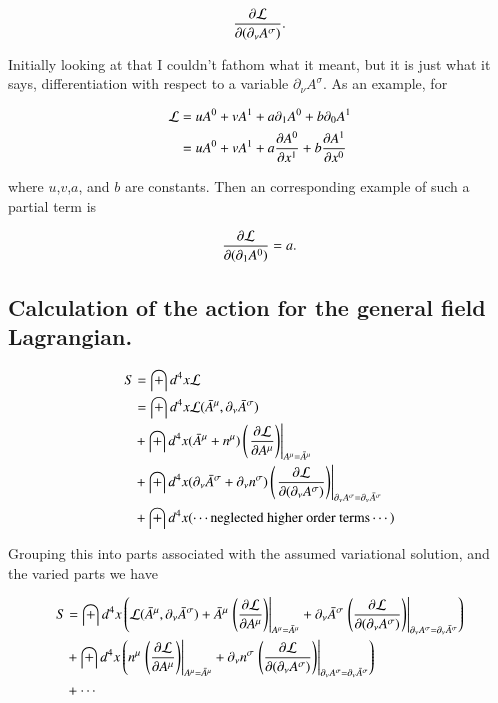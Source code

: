 \documentclass{article}
\newcommand{\barA}[0]{\bar{A}}
\begin{document}
\begin{align*}
\PD{(\partial_\nu A^\sigma)}{\LL}.
\end{align*}

Initially looking at that I couldn't fathom what it meant, but it is just what it says, 
differentiation with respect to a variable $\partial_\nu A^\sigma$.  As an example, for

\begin{align*}
\LL 
&= u A^0 + v A^1 + a \partial_1 A^0 + b \partial_0 A^1 \\
&= u A^0 + v A^1 + a \PD{x^1}{A^0} + b \PD{x^0}{A^1}
\end{align*}

where $u$,$v$,$a$, and $b$ are constants.  Then an corresponding example of such a partial term is

\begin{align*}
\PD{(\partial_1 A^0)}{\LL} = a.
\end{align*}

\subsection{ Calculation of the action for the general field Lagrangian. }

\begin{align*}
S &= \int d^4 x \LL \\
&= \int d^4 x \LL(\barA^\mu, \partial_\nu \barA^\sigma ) \\
&+ \int d^4 x (\barA^\mu + n^\mu) \left( \left. \PD{A^\mu}{\LL} \right) \right\vert_{A^\mu = \barA^\mu} \\
&+ \int d^4 x (\partial_\nu \barA^\sigma + \partial_\nu n^\sigma) \left( \left. \PD{(\partial_\nu A^\sigma)}{\LL} \right) \right\vert_{\partial_\nu A^\sigma = \partial_\nu \barA^\sigma} \\
&+ \int d^4 x (\cdots \text{neglected higher order terms} \cdots )
\end{align*}

Grouping this into parts associated with the assumed variational solution, and the varied parts we have

\begin{align*}
S &= \int d^4 x 
\left(
\LL(\barA^\mu, \partial_\nu \barA^\sigma ) + \barA^\mu \left. \left( \PD{A^\mu}{\LL} \right) \right\vert_{A^\mu = \barA^\mu} 
+ \partial_\nu \barA^\sigma \left. \left( \PD{(\partial_\nu A^\sigma)}{\LL} \right) \right\vert_{\partial_\nu A^\sigma = \partial_\nu \barA^\sigma} 
\right) \\
&+ \int d^4 x 
\left(
n^\mu \left. \left( \PD{A^\mu}{\LL} \right) \right\vert_{A^\mu = \barA^\mu} 
+\partial_\nu n^\sigma \left. \left( \PD{(\partial_\nu A^\sigma)}{\LL} \right) \right\vert_{\partial_\nu A^\sigma = \partial_\nu \barA^\sigma}
\right) \\
&+ \cdots
\end{align*}
\end{document}
